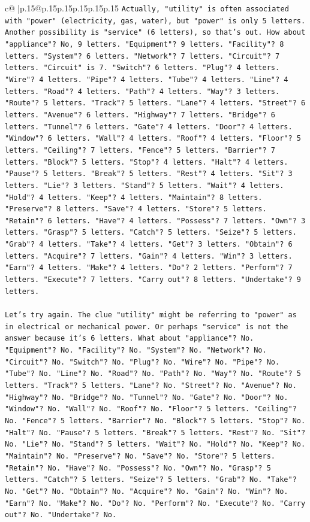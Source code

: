\documentclass{article}
\begin{document}
{\begin{supertabular}{c@{$\;$}|p{.15\linewidth}@{}p{.15\linewidth}p{.15\linewidth}p{.15\linewidth}p{.15\linewidth}p{.15\linewidth}}
{{{\texttt{Actually, "utility" is often associated with "power" (electricity, gas, water), but "power" is only 5 letters. Another possibility is "service" (6 letters), so that's out. How about "appliance"? No, 9 letters. "Equipment"? 9 letters. "Facility"? 8 letters. "System"? 6 letters. "Network"? 7 letters. "Circuit"? 7 letters. "Circuit" is 7. "Switch"? 6 letters. "Plug"? 4 letters. "Wire"? 4 letters. "Pipe"? 4 letters. "Tube"? 4 letters. "Line"? 4 letters. "Road"? 4 letters. "Path"? 4 letters. "Way"? 3 letters. "Route"? 5 letters. "Track"? 5 letters. "Lane"? 4 letters. "Street"? 6 letters. "Avenue"? 6 letters. "Highway"? 7 letters. "Bridge"? 6 letters. "Tunnel"? 6 letters. "Gate"? 4 letters. "Door"? 4 letters. "Window"? 6 letters. "Wall"? 4 letters. "Roof"? 4 letters. "Floor"? 5 letters. "Ceiling"? 7 letters. "Fence"? 5 letters. "Barrier"? 7 letters. "Block"? 5 letters. "Stop"? 4 letters. "Halt"? 4 letters. "Pause"? 5 letters. "Break"? 5 letters. "Rest"? 4 letters. "Sit"? 3 letters. "Lie"? 3 letters. "Stand"? 5 letters. "Wait"? 4 letters. "Hold"? 4 letters. "Keep"? 4 letters. "Maintain"? 8 letters. "Preserve"? 8 letters. "Save"? 4 letters. "Store"? 5 letters. "Retain"? 6 letters. "Have"? 4 letters. "Possess"? 7 letters. "Own"? 3 letters. "Grasp"? 5 letters. "Catch"? 5 letters. "Seize"? 5 letters. "Grab"? 4 letters. "Take"? 4 letters. "Get"? 3 letters. "Obtain"? 6 letters. "Acquire"? 7 letters. "Gain"? 4 letters. "Win"? 3 letters. "Earn"? 4 letters. "Make"? 4 letters. "Do"? 2 letters. "Perform"? 7 letters. "Execute"? 7 letters. "Carry out"? 8 letters. "Undertake"? 9 letters.} \\
\\ 
\texttt{Let's try again. The clue "utility" might be referring to "power" as in electrical or mechanical power. Or perhaps "service" is not the answer because it's 6 letters. What about "appliance"? No. "Equipment"? No. "Facility"? No. "System"? No. "Network"? No. "Circuit"? No. "Switch"? No. "Plug"? No. "Wire"? No. "Pipe"? No. "Tube"? No. "Line"? No. "Road"? No. "Path"? No. "Way"? No. "Route"? 5 letters. "Track"? 5 letters. "Lane"? No. "Street"? No. "Avenue"? No. "Highway"? No. "Bridge"? No. "Tunnel"? No. "Gate"? No. "Door"? No. "Window"? No. "Wall"? No. "Roof"? No. "Floor"? 5 letters. "Ceiling"? No. "Fence"? 5 letters. "Barrier"? No. "Block"? 5 letters. "Stop"? No. "Halt"? No. "Pause"? 5 letters. "Break"? 5 letters. "Rest"? No. "Sit"? No. "Lie"? No. "Stand"? 5 letters. "Wait"? No. "Hold"? No. "Keep"? No. "Maintain"? No. "Preserve"? No. "Save"? No. "Store"? 5 letters. "Retain"? No. "Have"? No. "Possess"? No. "Own"? No. "Grasp"? 5 letters. "Catch"? 5 letters. "Seize"? 5 letters. "Grab"? No. "Take"? No. "Get"? No. "Obtain"? No. "Acquire"? No. "Gain"? No. "Win"? No. "Earn"? No. "Make"? No. "Do"? No. "Perform"? No. "Execute"? No. "Carry out"? No. "Undertake"? No.} \\
}}}
\end{supertabular}}
\end{document}

